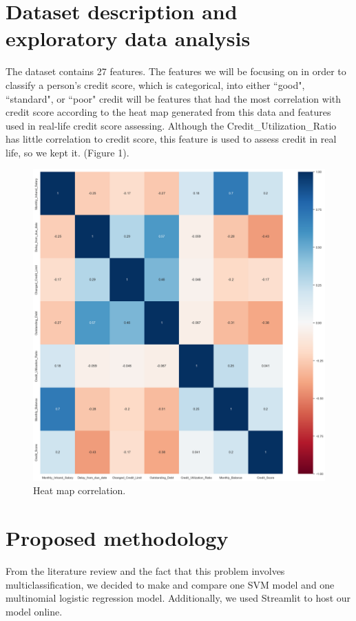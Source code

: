 \documentclass{article}
\begin{document}
\section*{Dataset description and exploratory data analysis}
The dataset contains 27 features. The features we will be focusing on in order
to classify a person's credit score, which is categorical, into either ``good", ``standard", or ``poor" credit
will be features that had the most correlation with credit score according to the heat map
generated from this data and features used in real-life credit score assessing. Although the Credit\_Utilization\_Ratio has little 
correlation to credit score, this feature is used to assess credit in real life, so we kept it. (Figure 1).\\
\begin{figure}[h]
    \includegraphics[width=\textwidth]{credscoreheatmap.png}
    \caption{Heat map correlation.}
    \label{fig:figure1}
\end{figure}
\newpage
\section*{Proposed methodology}
From the literature review and the fact that this problem involves multiclassification,
we decided to make and compare one SVM model and one multinomial logistic regression
model. Additionally, we used Streamlit to host our model online.
\end{document}
